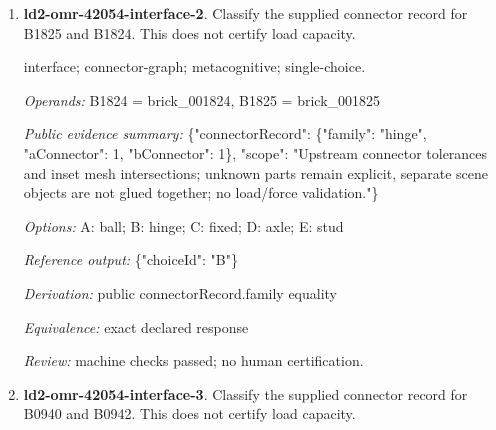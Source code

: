 \begin{enumerate}
\par{\small interface; connector-graph; metacognitive; single-choice.\par\textit{Operands:} B1848 = brick\_001848, B1852 = brick\_001852\par\textit{Public evidence summary:} \{"connectorRecord": \{"family": "axle", "aConnector": 0, "bConnector": 0\}, "scope": "Upstream connector tolerances and inset mesh intersections; unknown parts remain explicit, separate scene objects are not glued together; no load/force validation."\}\par\textit{Options:} A: stud; B: fixed; C: ball; D: axle; E: hinge\par\textit{Reference output:} \{"choiceId": "D"\}\par\textit{Derivation:} public connectorRecord.family equality\par\textit{Equivalence:} exact declared response\par\textit{Review:} machine checks passed; no human certification.}
\item \textbf{ld2-omr-42054-interface-2}. Classify the supplied connector record for B1825 and B1824. This does not certify load capacity.
\par{\small interface; connector-graph; metacognitive; single-choice.\par\textit{Operands:} B1824 = brick\_001824, B1825 = brick\_001825\par\textit{Public evidence summary:} \{"connectorRecord": \{"family": "hinge", "aConnector": 1, "bConnector": 1\}, "scope": "Upstream connector tolerances and inset mesh intersections; unknown parts remain explicit, separate scene objects are not glued together; no load/force validation."\}\par\textit{Options:} A: ball; B: hinge; C: fixed; D: axle; E: stud\par\textit{Reference output:} \{"choiceId": "B"\}\par\textit{Derivation:} public connectorRecord.family equality\par\textit{Equivalence:} exact declared response\par\textit{Review:} machine checks passed; no human certification.}
\item \textbf{ld2-omr-42054-interface-3}. Classify the supplied connector record for B0940 and B0942. This does not certify load capacity.

\end{enumerate}
